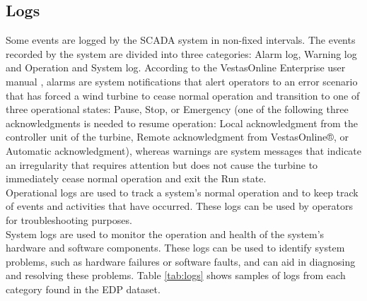  \subsection{Logs}
  Some events are logged by the SCADA system in non-fixed intervals. The events recorded by the system are divided into three categories: Alarm log, 
  Warning log and Operation and System log. According to the VestasOnline Enterprise user manual \cite{voe}, alarms are system notifications that alert operators to 
  an error scenario that has forced a wind turbine to cease normal operation and transition to one of three operational states: Pause, Stop, or 
  Emergency (one of the following three acknowledgments is needed to resume operation: Local acknowledgment 
  from the controller unit of the turbine, Remote acknowledgment from VestasOnline®, or Automatic acknowledgment), 
  whereas warnings are system messages that indicate an irregularity that requires attention but does not cause the turbine 
  to immediately cease normal operation and exit the Run state.\\
  Operational logs are used to track a system's normal operation and to keep track of events and activities that have occurred. 
  These logs can be used by operators for troubleshooting purposes.\\
  System logs are used to monitor the operation and health of the system's hardware and software components. 
  These logs can be used to identify system problems, such as hardware failures or software faults, and can aid in diagnosing and resolving these problems.
  Table \ref{tab:logs} shows samples of logs from each category found in the EDP dataset.


